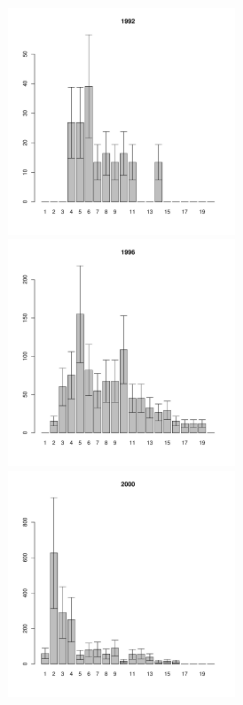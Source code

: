 \begin{figure}[h]

\begin{multicols}{3}
\hfill
\includegraphics[width=60mm]{../White_Sea/Luvenga_II_razrez/fucus_zone_1992_.pdf}
\hfill
\includegraphics[width=60mm]{../White_Sea/Luvenga_II_razrez/fucus_zone_1996_.pdf}
\hfill
\includegraphics[width=60mm]{../White_Sea/Luvenga_II_razrez/fucus_zone_2000_.pdf}
\end{multicols}




\end{figure}
